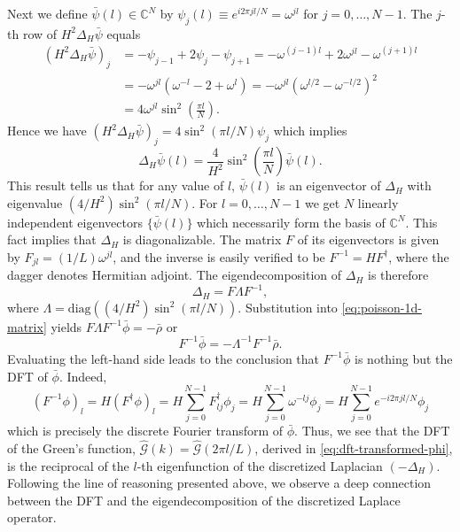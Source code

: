 Next we define $\bar{\psi}(l) \in \mathbb{C}^N$ by $\psi_j(l) \equiv e^{i2\pi jl/N} = \omega^{jl}$ for $j=0,\dots,N-1$.
The $j$-th row of $H^2\Delta_H \bar{\psi}$ equals
\begin{align*}
    (H^2\Delta_H \bar{\psi})_j
     & = -\psi_{j-1} + 2\psi_j - \psi_{j+1}
    = -\omega^{(j-1)l} + 2\omega^{jl} - \omega^{(j+1)l}     \\
     & = -\omega^{jl}(\omega^{-l} - 2 + \omega^l)
    = -\omega^{jl}(\omega^{l/2} - \omega^{-l/2})^2          \\
     & = 4\omega^{jl} \sin^2\left( \frac{\pi l}{N} \right).
\end{align*}
Hence we have $(H^2\Delta_H \bar{\psi})_j = 4\sin^2(\pi l/N) \psi_j$ which implies
\begin{equation*}
    \Delta_H \bar{\psi}(l)
    = \frac{4}{H^2} \sin^2\left( \frac{\pi l}{N} \right) \bar{\psi}(l).
\end{equation*}
This result tells us that for any value of $l$, $\bar{\psi}(l)$ is an eigenvector of $\Delta_H$ with eigenvalue $(4/H^2)\sin^2(\pi l/N)$.
For $l=0,\dots, N-1$ we get $N$ linearly independent eigenvectors $\{\bar{\psi}(l)\}$ which necessarily form the basis of $\mathbb{C}^N$.
This fact implies that $\Delta_H$ is diagonalizable.
The matrix $F$ of its eigenvectors is given by $F_{jl} = (1/L) \omega^{jl}$, and the inverse is easily verified to be $F^{-1} = H F^\dagger$, where the dagger denotes Hermitian adjoint.
The eigendecomposition of $\Delta_H$ is therefore
\begin{equation*}
    \Delta_H = F\Lambda F^{-1},
\end{equation*}
where $\Lambda = \text{diag}((4/H^2)\sin^2(\pi l/N))$.
Substitution into \autoref{eq:poisson-1d-matrix} yields $F\Lambda F^{-1} \bar{\phi} = -\bar{\rho}$ or
\begin{equation*}
    F^{-1}\bar{\phi} = -\Lambda^{-1}F^{-1}\bar{\rho}.
\end{equation*}
Evaluating the left-hand side leads to the conclusion that $F^{-1}\bar\phi$ is nothing but the DFT of $\bar\phi$.
Indeed,
\begin{equation*}
    (F^{-1}\phi)_l
    = H (F^\dagger \phi)_l
    = H \sum_{j=0}^{N-1}F^\dagger_{lj}\phi_j
    = H \sum_{j=0}^{N-1}\omega^{-lj}\phi_j
    = H \sum_{j=0}^{N-1}e^{-i2\pi jl / N}\phi_j
\end{equation*}
which is precisely the discrete Fourier transform of $\bar\phi$.
Thus, we see that the DFT of the Green's function, $\hat{\mathcal{G}}(k) = \hat{\mathcal{G}}(2\pi l / L)$, derived in \autoref{eq:dft-transformed-phi}, is the reciprocal of the $l$-th eigenfunction of the discretized Laplacian $(-\Delta_H)$.
Following the line of reasoning presented above, we observe a deep connection between the DFT and the eigendecomposition of the discretized Laplace operator.

